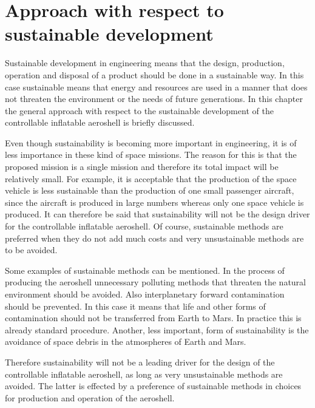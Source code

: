 \section{Approach with respect to sustainable development}\label{cha:sustain}
Sustainable development in engineering means that the design, production, operation and disposal of a product should be done in a sustainable way. In this case sustainable means that energy and resources are used in a manner that does not threaten the environment or the needs of future generations. \cite{sustain} In this chapter the general approach with respect to the sustainable development of the controllable inflatable aeroshell is briefly discussed.

Even though sustainability is becoming more important in engineering, it is of less importance in these kind of space missions. The reason for this is that the proposed mission is a single mission and therefore its total impact will be relatively small. For example, it is acceptable that the production of the space vehicle is less sustainable than the production of one small passenger aircraft, since the aircraft is produced in large numbers whereas only one space vehicle is produced. It can therefore be said that sustainability will not be the design driver for the controllable inflatable aeroshell. Of course, sustainable methods are preferred when they do not add much costs and very unsustainable methods are to be avoided.

Some examples of sustainable methods can be mentioned. In the process of producing the aeroshell unnecessary polluting methods that threaten the natural environment should be avoided. Also interplanetary forward contamination should be prevented. In this case it means that life and other forms of contamination should not be transferred from Earth to Mars. In practice this is already standard procedure. Another, less important, form of sustainability is the avoidance of space debris in the atmospheres of Earth and Mars.

Therefore sustainability will not be a leading driver for the design of the controllable inflatable aeroshell, as long as very unsustainable methods are avoided. The latter is effected by a preference of sustainable methods in choices for production and operation of the aeroshell.